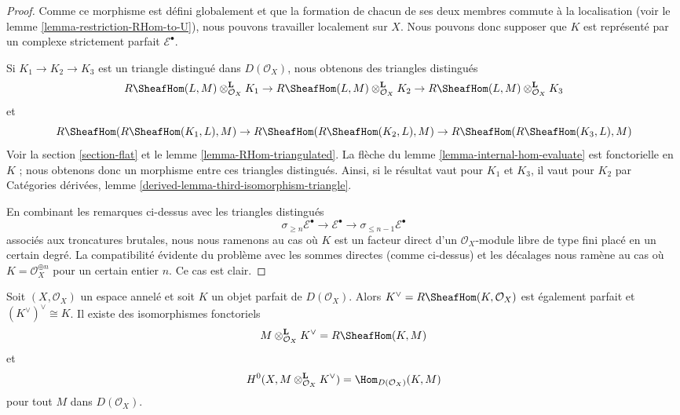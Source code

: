 {\begin{proof}
Comme ce morphisme est défini globalement et que la formation de chacun de ses deux membres commute à la localisation (voir le lemme \ref{lemma-restriction-RHom-to-U}), nous pouvons travailler localement sur $X$. Nous pouvons donc supposer que $K$ est représenté par un complexe strictement parfait $\mathcal{E}^\bullet$.

\medskip\noindent
Si $K_1 \to K_2 \to K_3$ est un triangle distingué dans $D(\mathcal{O}_X)$, nous obtenons des triangles distingués $$
R\SheafHom(L, M) \otimes_{\mathcal{O}_X}^\mathbf{L} K_1 \to
R\SheafHom(L, M) \otimes_{\mathcal{O}_X}^\mathbf{L} K_2 \to
R\SheafHom(L, M) \otimes_{\mathcal{O}_X}^\mathbf{L} K_3
$$ et $$
R\SheafHom(R\SheafHom(K_1, L), M) \to
R\SheafHom(R\SheafHom(K_2, L), M) \to
R\SheafHom(R\SheafHom(K_3, L), M)
$$ Voir la section \ref{section-flat} et le lemme \ref{lemma-RHom-triangulated}. La flèche du lemme \ref{lemma-internal-hom-evaluate} est fonctorielle en $K$ ; nous obtenons donc un morphisme entre ces triangles distingués. Ainsi, si le résultat vaut pour $K_1$ et $K_3$, il vaut pour $K_2$ par Catégories dérivées, lemme \ref{derived-lemma-third-isomorphism-triangle}.

\medskip\noindent
En combinant les remarques ci-dessus avec les triangles distingués $$
\sigma_{\geq n}\mathcal{E}^\bullet \to \mathcal{E}^\bullet \to
\sigma_{\leq n - 1}\mathcal{E}^\bullet
$$ associés aux troncatures brutales, nous nous ramenons au cas où $K$ est un facteur direct d'un $\mathcal{O}_X$-module libre de type fini placé en un certain degré. La compatibilité évidente du problème avec les sommes directes (comme ci-dessus) et les décalages nous ramène au cas où $K = \mathcal{O}_X^{\oplus n}$ pour un certain entier $n$. Ce cas est clair.
\end{proof}

\begin{lemma}

\label{lemma-dual-perfect-complex}
Soit $(X, \mathcal{O}_X)$ un espace annelé et soit $K$ un objet parfait de $D(\mathcal{O}_X)$. Alors $K^\vee = R\SheafHom(K, \mathcal{O}_X)$ est également parfait et $(K^\vee)^\vee \cong K$. Il existe des isomorphismes fonctoriels $$
M \otimes^\mathbf{L}_{\mathcal{O}_X} K^\vee = R\SheafHom(K, M)
$$ et $$
H^0(X, M \otimes^\mathbf{L}_{\mathcal{O}_X} K^\vee) =
\Hom_{D(\mathcal{O}_X)}(K, M)
$$ pour tout $M$ dans $D(\mathcal{O}_X)$.
\end{lemma}

}
